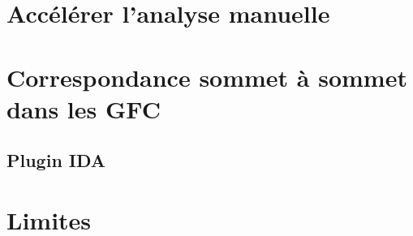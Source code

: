 \section{Accélérer l'analyse manuelle}

\section{Correspondance sommet à sommet dans les GFC}

\subsection{Plugin IDA}

\section{Limites}
